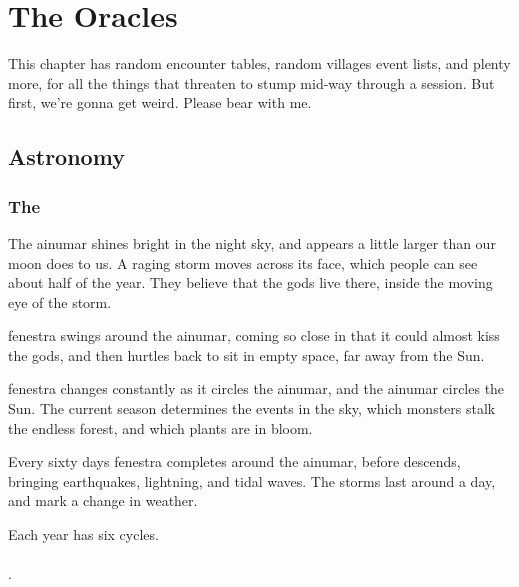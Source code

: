 \chapter{The Oracles}
\label{encounters}

This chapter has random encounter tables, random \glspl{village} event lists, and plenty more, for all the things that threaten to stump  mid-way through a session.
But first, we're gonna get weird.
Please bear with me.

\section{Astronomy}

\label{astronomy}
\label{seasons}

\begin{multicols}{2}

\subsection{The }

\begin{exampletext}
  The \gls{ainumar} shines bright in the night sky, and appears a little larger than our moon does to us.
  A raging storm moves across its face, which people can see about half of the year.
  They believe that the gods live there, inside the moving eye of the storm.

  \Gls{fenestra} swings around the \gls{ainumar}, coming so close in that it could almost kiss the gods, and then hurtles back to sit in empty space, far away from the Sun.
\end{exampletext}

\Gls{fenestra} changes constantly as it circles the \gls{ainumar}, and the \gls{ainumar} circles the Sun.
The current season determines the events in the sky, which \glspl{monster} stalk the endless forest, and which plants are in bloom.

Every sixty days \gls{fenestra} completes  around the \gls{ainumar}, before  descends, bringing earthquakes, lightning, and tidal waves.
The \glspl{storm} last around a day, and mark a change in weather.

Each year has six \glspl{cycle}.

\subsubsection{}
.


\end{multicols}
